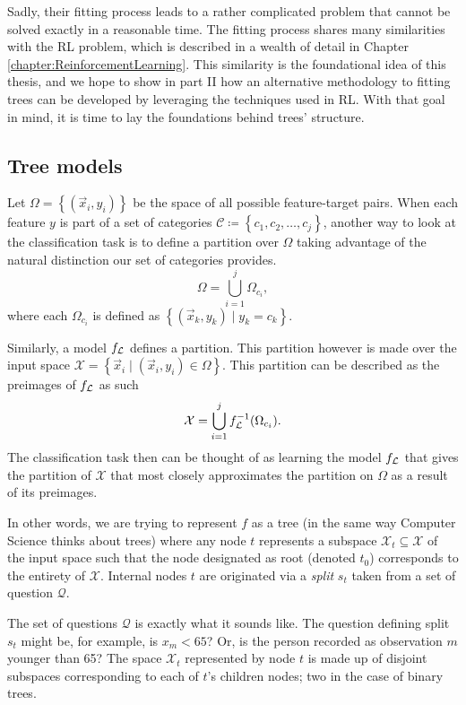 Sadly, their fitting process leads to a rather complicated problem that cannot
be solved exactly in a reasonable time. The fitting process shares many
similarities with the RL problem, which is described in a wealth of detail in
Chapter \ref{chapter:ReinforcementLearning}. This similarity is the foundational
idea of this thesis, and we hope to show in part II how an alternative
methodology to fitting trees can be developed by leveraging the techniques used
in RL. With that goal in mind, it is time to lay the foundations behind trees'
structure.

\subsection{Tree models}
Let $\Omega = \left\{ (\vec{x}_i, y_i) \right\}$ be the space of all possible
feature-target pairs. When each feature $y$ is part of a set of categories
$\mathcal{C} \coloneqq \left\{ c_1, c_2, \dots, c_j \right\}$, another way to
look at the classification task is to define a partition over $\Omega$ taking
advantage of the natural distinction our set of categories provides.
\begin{equation*}
    \Omega = \bigcup_{i=1}^{j} \Omega_{c_i},
\end{equation*}
where each $\Omega_{c_i}$ is defined as $\left\{ (\vec{x}_k, y_k) \mid y_k = c_k
\right\}$.

Similarly, a model $f_{\mathcal{L}}$ defines a partition. This partition however is made
over the input space $\mathcal{X} = \left\{ \vec{x}_i \mid (\vec{x}_i, y_i) \in
\Omega \right\}$. This partition can be described as the preimages of $f_{\mathcal{L}}$ as
such
\begin{equation*}
    \mathcal{X} = \bigcup_{i=1}^{j} f_{\mathcal{L}}^{-1}(\Omega_{c_i}).
\end{equation*}
The classification task then can be thought of as learning the model $f_{\mathcal{L}}$ that
gives the partition of $\mathcal{X}$ that most closely approximates the
partition on $\Omega$ as a result of its preimages.

In other words, we are trying to represent $f$ as a tree (in the same way
Computer Science thinks about trees) where any node $t$ represents a subspace
$\mathcal{X}_t \subseteq \mathcal{X}$ of the input space such that the node
designated as root (denoted $t_0$) corresponds to the entirety of $\mathcal{X}$.
Internal nodes $t$ are originated via a \textit{split} $s_t$ taken from a set of
question $\mathcal{Q}$.

The set of questions $\mathcal{Q}$ is exactly what it sounds like. The question
defining split $s_t$ might be, for example, is $x_m < 65$? Or, is the person
recorded as observation $m$ younger than 65? The space $\mathcal{X}_t$
represented by node $t$ is made up of disjoint subspaces corresponding to each
of $t$'s children nodes; two in the case of binary trees. 

